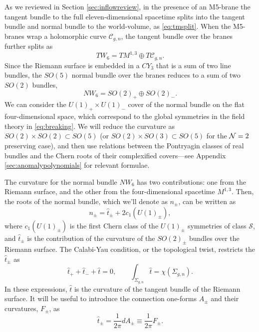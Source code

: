 \documentclass[a4paper,11pt]{article}
\def\CN{{\cal N}}
\begin{document}
As we reviewed in Section \ref{sec:inflowreview}, in the presence of an M5-brane the tangent bundle to the full eleven-dimensional spacetime splits into the tangent bundle and normal bundle to the world-volume, as \eqref{eq:tmsplit}. When the M5-branes wrap a holomorphic curve $\mathcal{C}_{g,n}$, the tangent bundle over the branes further splits as
\begin{equation}
TW_6 = TM^{1,3} \oplus T\mathcal{C}_{g,n}.
\end{equation} Since the Riemann surface is embedded in a $CY_3$ that is a sum of two line bundles, the $SO(5)$ normal bundle over the branes reduces to a sum of two $SO(2)$ bundles,
\begin{equation}
NW_6 = SO(2)_+ \oplus SO(2)_-.
\end{equation} 
We can consider the $U(1)_+\times U(1)_-$ cover of the normal bundle on the flat four-dimensional space, which correspond to the global symmetries in the field theory in \eqref{eq:breaking}. We will reduce the curvature as $SO(2)\times SO(2)\subset SO(5)$ (or $SO(2)\times SO(3)\subset SO(5)$ for the $\CN=2$ preserving case), and then use relations between the Pontryagin classes of real bundles and the Chern roots of their complexified covers---see Appendix \ref{sec:anomalypolynomials} for relevant formulae.

The curvature for the normal bundle $NW_6$ has two contributions: one from the Riemann surface, and the other from the four-dimensional spacetime $M^{1,3}$.  Then, the roots of the normal bundle, which we'll denote as $n_\pm$, can be written as
\begin{equation}
n_\pm = \hat{t}_\pm+  2c_1\left(U(1)_\pm\right),
\end{equation} where $c_1\left(U(1)_\pm \right)$ is the first Chern class of the $U(1)_\pm$ symmetries of class $\mathcal{S}$, and $\hat{t}_\pm$ is the contribution of the curvature of the $SO(2)_\pm$ bundles over the Riemann surface.  The Calabi-Yau condition, or the topological twist, restricts the $\hat{t}_\pm$ as 
\begin{equation}
\hat{t}_+ +\hat{t}_- + \hat{t} =0, \qquad \int_{\Sigma_{g,n}} \hat{t} = \chi \left(\Sigma_{g,n} \right). \label{eq:background}%
\end{equation} In these expressions, $\hat{t}$ is the curvature of the tangent bundle of the Riemann surface.  It will be useful to introduce the connection one-forms $A_\pm$ and their curvatures, $F_\pm$, as
\begin{equation}
\hat{t}_\pm = \frac{1}{2\pi} d A_\pm \equiv \frac{1}{2\pi} F_\pm.
\end{equation}  
\end{document}
